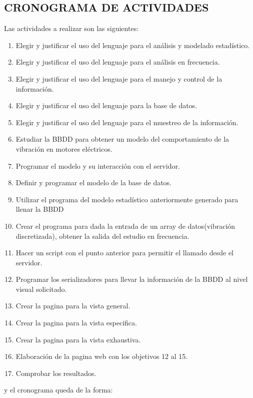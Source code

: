 
\subsection{CRONOGRAMA DE ACTIVIDADES}

	Las actividades a realizar son las siguientes: 


\begin{enumerate}
	\item Elegir y justificar el uso del lenguaje para el análisis y modelado estadístico.
	\item Elegir y justificar el uso del lenguaje para el análisis en frecuencia.
	\item Elegir y justificar el uso del lenguaje para el manejo y control de la información.
	\item Elegir y justificar el uso del lenguaje para la base de datos.
	\item Elegir y justificar el uso del lenguaje para el muestreo de la información.
	\item Estudiar la BBDD para obtener un modelo del comportamiento de la vibración en motores eléctricos.
	\item Programar el modelo y su interacción con el servidor.
	\item Definir y programar el modelo de la base de datos.
	\item Utilizar el programa del modelo estadístico anteriormente generado para llenar la BBDD
	\item Crear el programa para dada la entrada de un array de datos(vibración discretizada), obtener la salida del estudio en frecuencia.
	\item Hacer un script con el punto anterior para permitir el llamado desde el servidor. 
	\item Programar los serializadores para llevar la información de la BBDD al nivel visual solicitado.
	\item Crear la pagina para la vista general.
	\item Crear la pagina para la vista especifica.
	\item Crear la pagina para la vista exhaustiva.
	\item Elaboración de la pagina web con los objetivos 12 al 15.
	\item Comprobar los resultados.
\end{enumerate}


	y el cronograma queda de la forma:\\